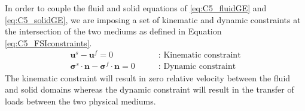 In order to couple the fluid and solid equations of \eqref{eq:C5_fluidGE} and \eqref{eq:C5_solidGE}, we are imposing a set of kinematic and dynamic constraints \cite{van2007comparison} at the intersection of the two mediums as defined in Equation \eqref{eq:C5_FSIconstraints}.
%
\begin{subequations}\label{eq:C5_FSIconstraints}
\begin{align}
	\mathbf{u}^s - \mathbf{u}^f = 0
	\quad \quad &\text{: Kinematic constraint}
	\\
	\mathbf{\sigma}^s \cdot \mathbf{n} - \mathbf{\sigma}^f \cdot \mathbf{n} = 0
	\quad \quad &\text{: Dynamic constraint}
\end{align}
\end{subequations}
%
The kinematic constraint will result in zero relative velocity between the fluid and solid domains whereas the dynamic constraint will result in the transfer of loads between the two physical mediums.
